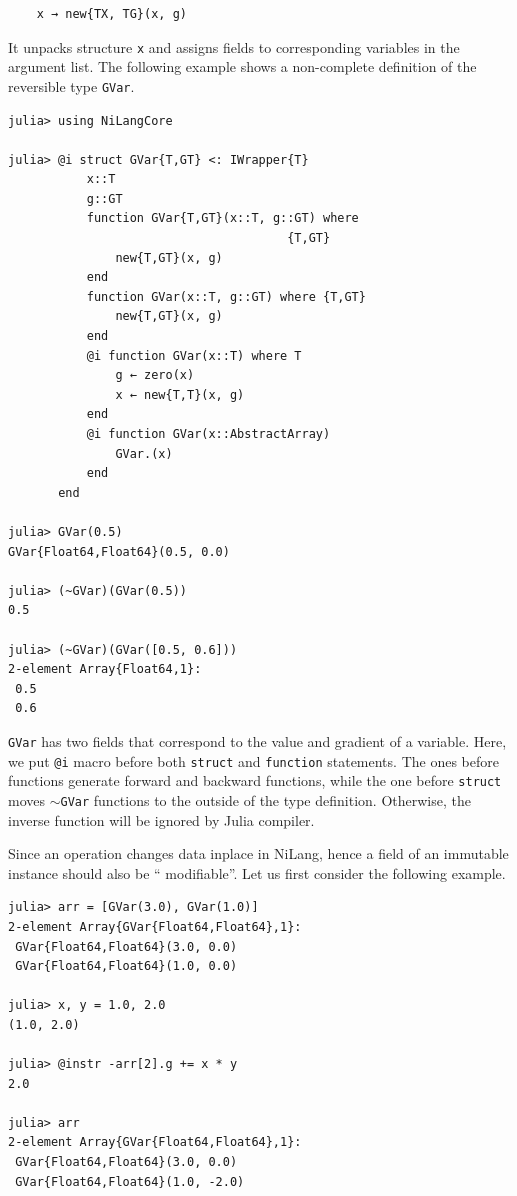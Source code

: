 \documentclass[aps,twocolumn,longbibliography,english,superscriptaddress]{revtex4-1}
\newcommand{\<}{\langle}
\renewcommand{\>}{\rangle}
\theoremstyle{definition}\newtheorem{definition}{\textit{Definition}}
\begin{document}
\begin{minipage}{.44\textwidth}
\begin{lstlisting}
    x → new{TX, TG}(x, g)
\end{lstlisting}
\end{minipage}

It unpacks structure \texttt{x} and assigns fields to corresponding variables in the argument list.
The following example shows a non-complete definition of the reversible type \texttt{GVar}.

\begin{minipage}{.44\textwidth}
\begin{lstlisting}
julia> using NiLangCore

julia> @i struct GVar{T,GT} <: IWrapper{T}
           x::T
           g::GT
           function GVar{T,GT}(x::T, g::GT) where
                                       {T,GT}
               new{T,GT}(x, g)
           end
           function GVar(x::T, g::GT) where {T,GT}
               new{T,GT}(x, g)
           end
           @i function GVar(x::T) where T
               g ← zero(x)
               x ← new{T,T}(x, g)
           end
           @i function GVar(x::AbstractArray)
               GVar.(x)
           end
       end

julia> GVar(0.5)
GVar{Float64,Float64}(0.5, 0.0)

julia> (~GVar)(GVar(0.5))
0.5

julia> (~GVar)(GVar([0.5, 0.6]))
2-element Array{Float64,1}:
 0.5
 0.6
\end{lstlisting}
\end{minipage}

\texttt{GVar} has two fields that correspond to the value and gradient of a variable.
Here, we put \texttt{@i} macro before both \texttt{struct} and \texttt{function} statements.
The ones before functions generate forward and backward functions, while the one before \texttt{struct} moves \texttt{$\sim$GVar} functions to the outside of the type definition. Otherwise, the inverse function will be ignored by Julia compiler.

Since an operation changes data inplace in NiLang, hence a field of an immutable instance should also be `` modifiable''.
Let us first consider the following example.

\begin{minipage}{.44\textwidth}
\begin{lstlisting}
julia> arr = [GVar(3.0), GVar(1.0)]
2-element Array{GVar{Float64,Float64},1}:
 GVar{Float64,Float64}(3.0, 0.0)
 GVar{Float64,Float64}(1.0, 0.0)

julia> x, y = 1.0, 2.0
(1.0, 2.0)

julia> @instr -arr[2].g += x * y
2.0

julia> arr
2-element Array{GVar{Float64,Float64},1}:
 GVar{Float64,Float64}(3.0, 0.0) 
 GVar{Float64,Float64}(1.0, -2.0)
\end{lstlisting}
\end{minipage}
\end{document}
